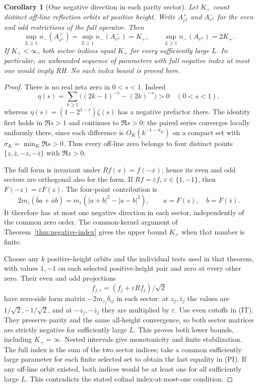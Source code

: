 \documentclass[11pt]{article}
\newtheorem{corollary}[theorem]{Corollary}
\theoremstyle{remark}\newtheorem{remark}[theorem]{Remark}
\begin{document}
\begin{corollary}[One negative direction in each parity sector]
\label{cor:parity-index}
Let $K_+$ count distinct off-line reflection orbits at positive
height. Write $A_{e^L}^+$ and $A_{e^L}^-$ for the even and odd
restrictions of the full operator. Then
\[
 \sup_{L\ge1}n_-(A_{e^L}^+)
 =\sup_{L\ge1}n_-(A_{e^L}^-)=K_+,\qquad
 \sup_{L\ge1}n_-(A_{e^L})=2K_+.                       \tag{PI}
\]
If $K_+<\infty$, both sector indices equal $K_+$ for every
sufficiently large $L$. In particular, an unbounded sequence
of parameters with full negative index at most one would imply RH.
No such index bound is proved here.
\end{corollary}
\begin{proof}
There is no real zeta zero in $0<s<1$. Indeed
\[
 \eta(s)=\sum_{k\ge1}\bigl((2k-1)^{-s}-(2k)^{-s}\bigr)>0
                          \quad(0<s<1),
\]
whereas $\eta(s)=(1-2^{1-s})\zeta(s)$ has a negative
prefactor there. The identity first holds in $\Re s>1$
and continues to $\Re s>0$: the paired series converges
locally uniformly there, since each difference is
$O_K(k^{-1-\sigma_K})$ on a compact set with
$\sigma_K=\min_K\Re s>0$.
Thus every off-line zero belongs to four distinct points
$\{z,\bar z,-z,-\bar z\}$ with $\Re z>0$.

The full form is invariant under $Rf(x)=f(-x)$; hence its
even and odd sectors are orthogonal also for the form.
If $Rf=\varepsilon f$, $\varepsilon\in\{1,-1\}$, then
$F(-z)=\varepsilon F(z)$. The four-point contribution is
\[
 2m_z(\bar b a+\bar a b)
                  =m_z(|a+b|^2-|a-b|^2),
 \qquad a=F(z),\quad b=F(\bar z).
\]
It therefore has at most one negative direction in each
sector, independently of the common zero order. The
common-kernel argument of Theorem~\ref{thm:negative-index}
gives the upper bound $K_+$ when that number is finite.

Choose any $k$ positive-height orbits and the individual
tests used in that theorem, with values $1,-1$ on each
selected positive-height pair and zero at every other zero.
Their even and odd projections
\[
 f_{j,\varepsilon}=(f_j+\varepsilon Rf_j)/\sqrt2
\]
have zero-side form matrix $-2m_{z_j}\delta_{ij}$ in
each sector: at $z_j,\bar z_j$ the values are
$1/\sqrt2,-1/\sqrt2$, and at $-z_j,-\bar z_j$ they
are multiplied by $\varepsilon$.
Use even cutoffs in (IT). They preserve parity and the
same all-height convergence, so both sector matrices are
strictly negative for sufficiently large $L$.
This proves both lower bounds, including $K_+=\infty$.
Nested intervals give monotonicity and finite stabilization.
The full index is the sum of the two sector indices;
take a common sufficiently large parameter for each
finite selected set to obtain the last equality in (PI).
If any off-line orbit existed, both indices would be
at least one for all sufficiently large $L$. This
contradicts the stated cofinal index-at-most-one condition.
\end{proof}
\end{document}
